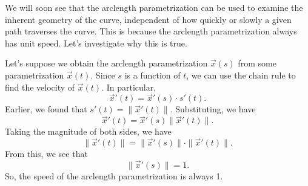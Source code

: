 \documentclass{ximera}
\begin{document}
We will soon see that the arclength parametrization can be used to examine the inherent geometry of the curve, independent of how quickly or slowly a given path traverses the curve. This is because the arclength parametrization always has unit speed. Let's investigate why this is true.

Let's suppose we obtain the arclength parametrization $\vec{x}(s)$ from some parametrization $\vec{x}(t)$. Since $s$ is a function of $t$, we can use the chain rule to find the velocity of $\vec{x}(t)$. In particular,
\[
\vec{x}'(t) = \vec{x}'(s)\cdot s'(t).
\]
Earlier, we found that $s'(t) = \|\vec{x}'(t)\|$. Substituting, we have
\[
\vec{x}'(t) = \vec{x}'(s)\|\vec{x}'(t)\|.
\]
Taking the magnitude of both sides, we have
\[
\|\vec{x}'(t)\| = \|\vec{x}'(s)\|\cdot \|\vec{x}'(t)\|.
\]
From this, we see that
\[
\|\vec{x}'(s)\| = 1.
\]
So, the speed of the arclength parametrization is always 1.
\end{document}
